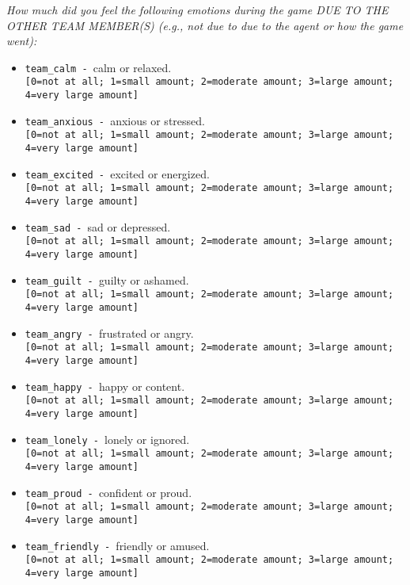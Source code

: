 \begin{description}
\begin{addmargin}[0em]{0em}
\begin{addmargin}[1em]{0em}
\begin{itemize}
        \end{itemize}
        \begin{addmargin}[1em]{0em}
            \textit{How much did you feel the following emotions during the game DUE TO THE OTHER TEAM MEMBER(S) (e.g., not due to due to the agent or how the game went):}
        \end{addmargin}
        \begin{itemize}
            \item \verb|team_calm - |calm or relaxed.\\\verb|[0=not at all; 1=small amount; 2=moderate amount; 3=large amount; 4=very large amount]|
            \item \verb|team_anxious - |anxious or stressed.\\\verb|[0=not at all; 1=small amount; 2=moderate amount; 3=large amount; 4=very large amount]|
            \item \verb|team_excited - |excited or energized.\\\verb|[0=not at all; 1=small amount; 2=moderate amount; 3=large amount; 4=very large amount]|
            \item \verb|team_sad - |sad or depressed.\\\verb|[0=not at all; 1=small amount; 2=moderate amount; 3=large amount; 4=very large amount]|
            \item \verb|team_guilt - |guilty or ashamed.\\\verb|[0=not at all; 1=small amount; 2=moderate amount; 3=large amount; 4=very large amount]|
            \item \verb|team_angry - |frustrated or angry.\\\verb|[0=not at all; 1=small amount; 2=moderate amount; 3=large amount; 4=very large amount]|
            \item \verb|team_happy - |happy or content.\\\verb|[0=not at all; 1=small amount; 2=moderate amount; 3=large amount; 4=very large amount]|
            \item \verb|team_lonely - |lonely or ignored.\\\verb|[0=not at all; 1=small amount; 2=moderate amount; 3=large amount; 4=very large amount]|
            \item \verb|team_proud - |confident or proud.\\\verb|[0=not at all; 1=small amount; 2=moderate amount; 3=large amount; 4=very large amount]|
            \item \verb|team_friendly - |friendly or amused.\\\verb|[0=not at all; 1=small amount; 2=moderate amount; 3=large amount; 4=very large amount]|

\end{itemize}
\end{addmargin}
\end{addmargin}
\end{description}

